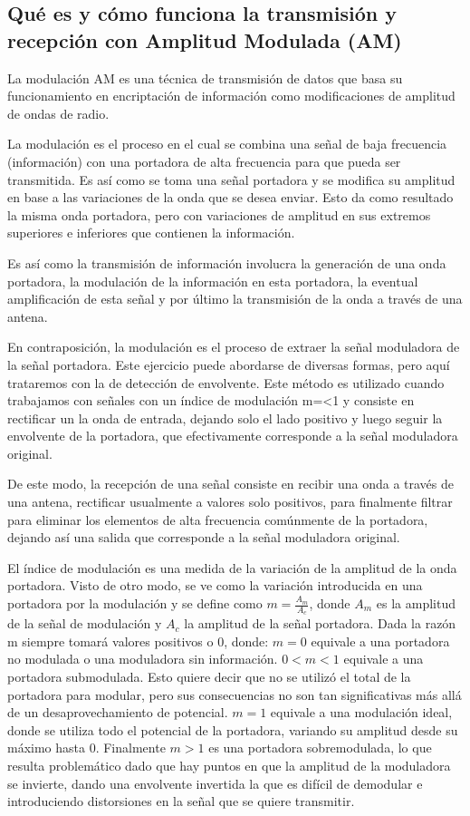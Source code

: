 \subsection{Qué es y cómo funciona la transmisión y recepción con Amplitud Modulada (AM)}
La modulación AM es una técnica de transmisión de datos que basa su funcionamiento en encriptación de información como modificaciones de amplitud de ondas de radio.
 
La modulación es el proceso en el cual se combina una señal de baja frecuencia (información) con una portadora de alta frecuencia para que pueda ser transmitida. Es así como se toma una señal portadora y se modifica su amplitud en base a las variaciones de la onda que se desea enviar. Esto da como resultado la misma onda portadora, pero con variaciones de amplitud en sus extremos superiores e inferiores que contienen la información.

Es así como la transmisión de información involucra la generación de una onda portadora, la modulación de la información en esta portadora, la eventual amplificación de esta señal y por último la transmisión de la onda a través de una antena.

En contraposición, la modulación es el proceso de extraer la señal moduladora de la señal portadora. Este ejercicio puede abordarse de diversas formas, pero aquí trataremos con la de detección de envolvente. Este método es utilizado cuando trabajamos con señales con un índice de modulación m=<1 y consiste en rectificar un la onda de entrada, dejando solo el lado positivo y luego seguir la envolvente de la portadora, que efectivamente corresponde a la señal moduladora original.

De este modo, la recepción de una señal consiste en recibir una onda a través de una antena, rectificar usualmente a valores solo positivos, para finalmente filtrar para eliminar los elementos de alta frecuencia comúnmente de la portadora, dejando así una salida que corresponde a la señal moduladora original.

El índice de modulación es una medida de la variación de la amplitud de la onda portadora. Visto de otro modo, se ve como la variación introducida en una portadora por la modulación y se define como $m = \frac{A_m}{A_c}$, donde $A_m$ es la amplitud de la señal de modulación y $A_c$ la amplitud de la señal portadora. Dada la razón m siempre tomará valores positivos o 0, donde: $m=0$ equivale a una portadora no modulada o una moduladora sin información. $0<m<1$ equivale a una portadora submodulada. Esto quiere decir que no se utilizó el total de la portadora para modular, pero sus consecuencias no son tan significativas más allá de un desaprovechamiento de potencial. $m=1$ equivale a una modulación ideal, donde se utiliza todo el potencial de la portadora, variando su amplitud desde su máximo hasta 0. Finalmente $m>1$ es una portadora sobremodulada, lo que resulta problemático dado que hay puntos en que la amplitud de la moduladora se invierte, dando una envolvente invertida la que es difícil de demodular e introduciendo distorsiones en la señal que se quiere transmitir.



